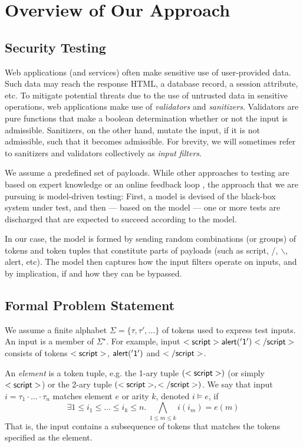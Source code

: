 \section{Overview of Our Approach}

\subsection{Security Testing}

Web applications (and services) often make sensitive use of user-provided data. Such data may reach the response HTML, a database record, a session attribute, etc. To mitigate potential threats due to the use of untrusted data in sensitive operations, web applications make use of \emph{validators} and \emph{sanitizers}. Validators are pure functions that make a boolean determination whether or not the input is admissible. Sanitizers, on the other hand, mutate the input, if it is not admissible, such that it becomes admissible. For brevity, we will sometimes refer to sanitizers and validators collectively as \emph{input filters}.

We assume a predefined set of payloads. While other approaches to testing are based on expert knowledge \cite{AppScan} or an online feedback loop \cite{TrippIssta:2013}, the approach that we are pursuing is model-driven testing: First, a model is devised of the black-box system under test, and then --- based on the model --- one or more tests are discharged that are expected to succeed according to the model.

In our case, the model is formed by sending random combinations (or groups) of tokens and token tuples that constitute parts of payloads (such as {\sf script}, {\sf /}, {\sf $\backslash$}, {\sf alert}, etc). The model then captures how the input filters operate on inputs, and by implication, if and how they can be bypassed.

\subsection{Formal Problem Statement}

We assume a finite alphabet $\Sigma=\{ \tau,\tau',\ldots \}$ of tokens used to express test inputs. An input is a member of $\Sigma^{\star}$. For example, input ${\sf <script>alert('1')</script>}$ consists of tokens ${\sf <script>}$, ${\sf alert('1')}$ and ${\sf </script>}$.

An \emph{element} is a token tuple, e.g. the 1-ary tuple ${\sf (<script>)}$ (or simply ${\sf <script>}$) or the 2-ary tuple ${\sf (<script>,</script>)}$. We say that input $i=\tau_1 \cdot \ldots \cdot \tau_n$ matches element $e$ or arity $k$, denoted $i \models e$, if
$$
\exists 1 \leq i_1 \leq \ldots \leq i_k \leq n.\ \bigwedge_{1 \leq m \leq k}
i(i_m) = e(m)  
$$
That is, the input contains a subsequence of tokens that matches the tokens specified as the element.

